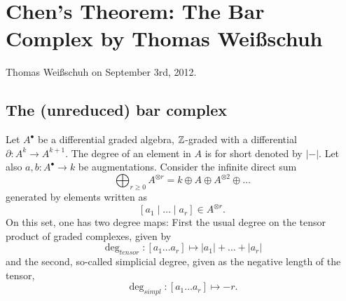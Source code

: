 \chapter{Chen's Theorem: The Bar Complex by Thomas Wei{\ss}schuh}

Thomas Wei\ss schuh on September 3rd, 2012.


\section{The (unreduced) bar complex}

Let $A^{\bullet}$ be a differential graded algebra, $\mathbb{Z}$-graded with a differential $\partial : A^k \to A^{k+1}$. The degree of an element in $A$ is for short denoted by $|-|$. 
Let also $a, b : A^{\bullet} \to k$ be augmentations. 
Consider the infinite direct sum 
\[
\bigoplus_{r \geq 0} A^{\otimes r} = k \oplus A \oplus A^{\otimes 2} \oplus \ldots
\]
generated by elements written as 
\[ [a_1 \mid \ldots \mid a_r] \in A^{\otimes r}. \]
On this set, one has two degree maps: First the usual degree on the tensor product of graded complexes, given by 
\[ \deg_{tensor} : [a_1 \ldots a_r] \mapsto |a_1| + \ldots + |a_r| \] %
and the second, so-called simplicial degree, given as the negative length of the tensor,
\[ \deg_{simpl} : [a_1 \ldots a_r] \mapsto -r. \]

